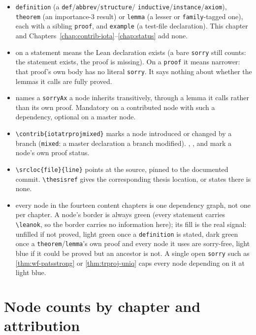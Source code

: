 \begin{itemize}
\item {} \texttt{definition} (a \texttt{def}/\texttt{abbrev}/\texttt{structure}/
\texttt{inductive}/\texttt{instance}/\texttt{axiom}), \texttt{theorem} (an importance-3 result) or
\texttt{lemma} (a lesser or \texttt{family}-tagged one), each with a sibling \texttt{proof}, and
\texttt{example} (a test-file declaration). This chapter and
Chapters~\ref{chap:contrib-iota}--\ref{chap:status} add none.
\item {} on a statement means the Lean declaration exists (a
bare \texttt{sorry} still counts: the statement exists, the proof is missing). On a \texttt{proof}
it means narrower: that proof's own body has no literal \texttt{sorry}. It says nothing about
whether the lemmas it calls are fully proved.
\item {} names a \texttt{sorryAx} a node inherits transitively,
through a lemma it calls rather than its own proof. Mandatory on a contributed node with such a
dependency, optional on a master node.
\item {} \texttt{\textbackslash contrib\{iota\textbar trproj\textbar mixed\}} marks a
node introduced or changed by a branch (\texttt{mixed}: a master declaration a branch modified).
\stProved{}, \stSorry{}, \stTainted{} and \stExperimental{} mark a node's own proof status.
\item {}
\texttt{\textbackslash srcloc\{file\}\{line\}} points at the source, pinned to the documented
commit. \texttt{\textbackslash thesisref} gives the corresponding thesis location, or states there
is none.
\item {} every node in the fourteen content chapters is one dependency graph, not
one per chapter. A node's border is always green (every statement carries
\texttt{\textbackslash leanok}, so the border carries no information here); its fill is the real
signal: unfilled if not proved, light green once a \texttt{definition} is stated, dark green once
a \texttt{theorem}/\texttt{lemma}'s own proof and every node it uses are sorry-free, light blue if
it could be proved but an ancestor is not. A single open \texttt{sorry} such as
\ref{thm:wf-patsstrong} or \ref{thm:trproj-uniq} caps every node depending on it at light blue.
\end{itemize}

\section{Node counts by chapter and attribution}
\label{sec:intro-node-counts}

